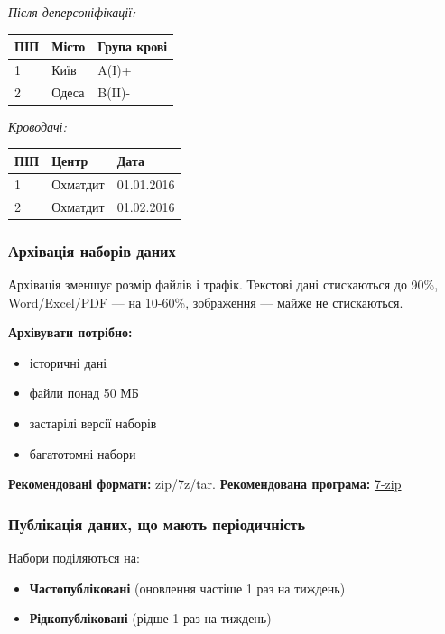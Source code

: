 \textit{Після деперсоніфікації:}

\begin{tabular}{|l|l|l|}
\hline
ПІП & Місто & Група крові \\
\hline
1   & Київ  & A(I)+       \\
2   & Одеса & B(II)-      \\
\hline
\end{tabular}

\textit{Кроводачі:}

\begin{tabular}{|l|l|l|}
\hline
ПІП & Центр    & Дата       \\
\hline
1   & Охматдит & 01.01.2016 \\
2   & Охматдит & 01.02.2016 \\
\hline
\end{tabular}

\subsubsection{Архівація наборів даних}

Архівація зменшує розмір файлів і трафік. Текстові дані стискаються до 90\%, Word/Excel/PDF — на 10-60\%, зображення — майже не стискаються.

\textbf{Архівувати потрібно:}

\begin{itemize}
    \item історичні дані
    \item файли понад 50 МБ
    \item застарілі версії наборів
    \item багатотомні набори
\end{itemize}

\textbf{Рекомендовані формати:} zip/7z/tar.  
\textbf{Рекомендована програма:} \href{http://7-zip.org.ua/}{7-zip}

\subsubsection{Публікація даних, що мають періодичність}

Набори поділяються на:

\begin{itemize}
    \item \textbf{Частопубліковані} (оновлення частіше 1 раз на тиждень)
    \item \textbf{Рідкопубліковані} (рідше 1 раз на тиждень)
\end{itemize}

